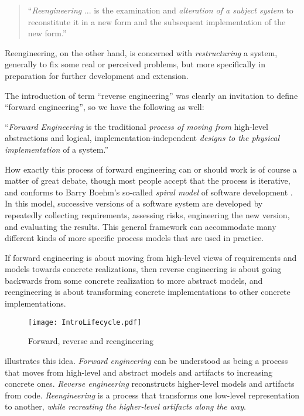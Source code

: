 \documentclass[a4paper,10pt,twoside]{book}
\begin{document}
\begin{quotation}
\noindent
``\emph{Reengineering} ... is the examination and \emph{alteration of a subject system} to reconstitute it in a new form and the subsequent implementation of the new form.''
\end{quotation}

Reengineering, on the other hand, is concerned with \emph{restructuring} a system, generally to fix some real or perceived problems, but more specifically in preparation for further development and extension.

The introduction of term ``reverse engineering'' was clearly an invitation to define ``forward engineering'', so we have the following as well:

``\emph{Forward Engineering} is the traditional \emph{process of moving from} high-level abstractions and logical, implementation-independent \emph{designs to the physical implementation} of a system.''

How exactly this process of forward engineering can or should work is of course a matter of great debate, though most people accept that the process is iterative, and conforms to Barry Boehm's so-called \emph{spiral model} of software development \cite{Boeh88a}. In this model, successive versions of a software system are developed by repeatedly collecting requirements, assessing risks, engineering the new version, and evaluating the results. This general framework can accommodate many different kinds of more specific process models that are used in practice.

If forward engineering is about moving from high-level views of requirements and models towards concrete realizations, then reverse engineering is about going backwards from some concrete realization to more abstract models, and reengineering is about transforming concrete implementations to other concrete implementations.

\begin{figure}
\begin{center}
\texttt{[image: IntroLifecycle.pdf]}
\caption{Forward, reverse and reengineering}
\end{center}
\end{figure}

 illustrates this idea. \emph{Forward engineering} can be understood as being a process that moves from high-level and abstract models and artifacts to increasing concrete ones. \emph{Reverse engineering} reconstructs higher-level models and artifacts from code. \emph{Reengineering} is a process that transforms one low-level representation to another, \emph{while recreating the higher-level artifacts along the way}. 
\end{document}
